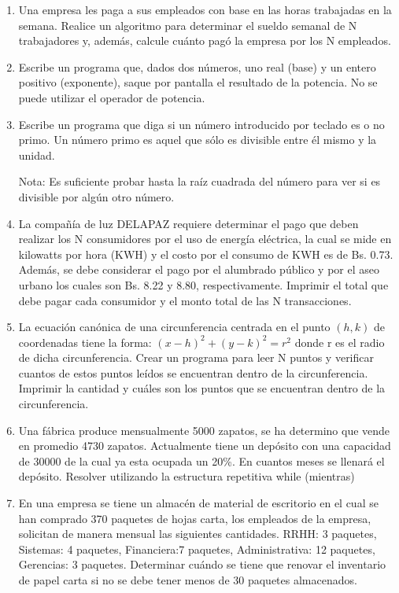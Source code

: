 \documentclass{scrartcl}
\begin{document}
\begin{enumerate}
		\item Una empresa les paga a sus empleados con base en las horas trabajadas en la semana. Realice un algoritmo para determinar el sueldo semanal de N trabajadores y, además, calcule cuánto pagó la empresa por los N empleados.
		
		\item Escribe un programa que, dados dos números, uno real (base) y un entero positivo (exponente), saque por pantalla el resultado de la potencia. No se puede utilizar el operador de potencia.
		
		\item Escribe un programa que diga si un número introducido por teclado es o no primo. Un número primo es aquel que sólo es divisible entre él mismo y la unidad.
		
		Nota: Es suficiente probar hasta la raíz cuadrada del número para ver si es	divisible por algún otro número.
		
		\item La compañía de luz DELAPAZ requiere determinar el pago que deben realizar los	N consumidores por el uso de energía eléctrica, la cual se mide en kilowatts por hora (KWH) y el costo por el consumo de KWH es de Bs. 0.73. Además, se debe considerar el pago por el alumbrado público y por el aseo urbano los cuales son Bs. 8.22 y 8.80, respectivamente. Imprimir el total que debe pagar cada consumidor y el monto total de las N transacciones.
		
		\item La ecuación canónica de una circunferencia centrada en el punto $(h, k)$ de coordenadas tiene la forma: $(x-h)^2 + (y-k)^2 = r^2$ donde r es el radio de dicha circunferencia. Crear un programa para leer N puntos y verificar cuantos de estos	puntos leídos se encuentran dentro de la circunferencia. Imprimir la cantidad y	cuáles son los puntos que se encuentran dentro de la circunferencia.
		
		\item Una fábrica produce mensualmente 5000 zapatos, se ha determino que vende en promedio 4730 zapatos. Actualmente tiene un depósito con una capacidad de 30000 de la cual ya esta ocupada un 20\%. En cuantos meses se llenará el depósito. Resolver utilizando la estructura repetitiva while (mientras)
		
		\item En una empresa se tiene un almacén de material de escritorio en el cual se han comprado 370 paquetes de hojas carta, los empleados de la empresa, solicitan de manera mensual las siguientes cantidades. RRHH: 3 paquetes, Sistemas: 4 paquetes, Financiera:7 paquetes, Administrativa: 12 paquetes, Gerencias: 3	paquetes. Determinar cuándo se tiene que renovar el inventario de papel carta si	no se debe tener menos de 30 paquetes almacenados.
		

\end{enumerate}
\end{document}

